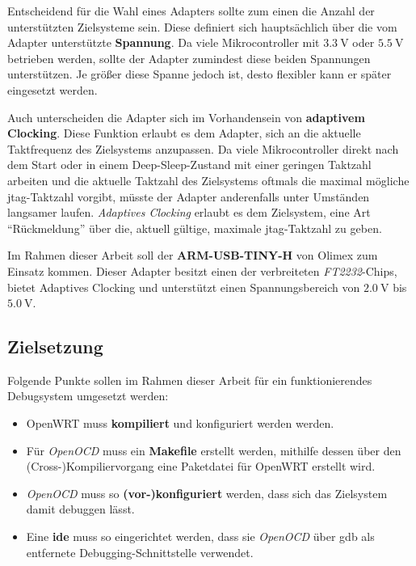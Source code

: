 Entscheidend für die Wahl eines Adapters sollte zum einen die Anzahl der
unterstützten Zielsysteme sein. Diese definiert sich hauptsächlich über die
vom Adapter unterstützte \textbf{Spannung}. Da viele Mikrocontroller mit
$\SI{3.3}{\volt}$ oder $\SI{5.5}{\volt}$ betrieben werden, sollte der Adapter
zumindest diese beiden Spannungen unterstützen. Je größer diese Spanne jedoch ist, desto flexibler kann
er später eingesetzt werden.

Auch unterscheiden die Adapter sich im Vorhandensein von \textbf{adaptivem
Clocking}. Diese Funktion erlaubt es dem Adapter, sich an die aktuelle
Taktfrequenz des Zielsystems anzupassen. Da viele Mikrocontroller direkt nach
dem Start oder in einem Deep-Sleep-Zustand mit einer geringen Taktzahl arbeiten
und die aktuelle Taktzahl des Zielsystems oftmals die maximal mögliche
\gls{jtag}-Taktzahl vorgibt, müsste der Adapter anderenfalls unter Umständen langsamer
laufen. \emph{Adaptives Clocking} erlaubt es dem Zielsystem, eine Art
"`Rückmeldung"' über die, aktuell gültige, maximale \gls{jtag}-Taktzahl zu geben.

Im Rahmen dieser Arbeit soll der \textbf{ARM-USB-TINY-H} von Olimex zum Einsatz
kommen.
Dieser Adapter besitzt einen der verbreiteten \emph{FT2232}-Chips, bietet
Adaptives Clocking und unterstützt einen Spannungsbereich von $\SI{2.0}{\volt}$
bis $\SI{5.0}{\volt}$.

\subsection{Zielsetzung}
Folgende Punkte sollen im Rahmen dieser Arbeit für ein funktionierendes
Debugsystem umgesetzt werden:
\begin{itemize}
  \item OpenWRT muss \textbf{kompiliert} und konfiguriert werden werden.
  \item Für \emph{OpenOCD} muss ein \textbf{Makefile} erstellt werden, mithilfe
  dessen über den \linebreak(Cross-)Kompiliervorgang eine Paketdatei für
  OpenWRT erstellt wird.
  \item \emph{OpenOCD} muss so \textbf{(vor-)konfiguriert} werden, dass sich das
  Zielsystem damit debuggen lässt.
  \item Eine \textbf{\gls{ide}} muss so eingerichtet werden, dass sie \emph{OpenOCD}
  über \gls{gdb} als entfernete Debugging-Schnittstelle verwendet.
\end{itemize}
